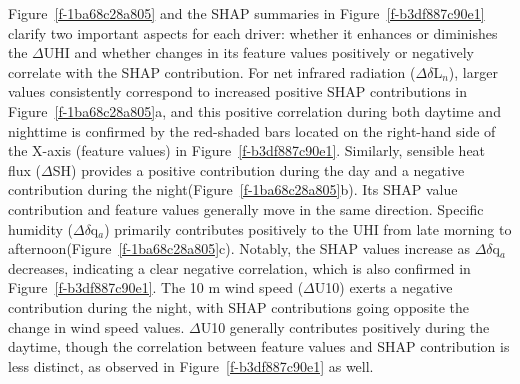 \documentclass[]{nature}
\makeatletter
\renewenvironment{figure}
               {\@float{figure}}
               {\end@float}
\renewenvironment{figure*}
               {\@dblfloat{figure}}
               {\end@dblfloat}
\def\fixFloatSize#1{}%
\def\fixFloatSize#1{}
\makeatother
\begin{document}
Figure~\ref{f-1ba68c28a805} and the SHAP summaries in Figure~\ref{f-b3df887c90e1}  clarify two important aspects for each driver: whether it enhances or diminishes the \ensuremath{\Delta }UHI and whether changes in its feature values positively or negatively correlate with the SHAP contribution. For net infrared radiation (\ensuremath{\Delta }\ensuremath{\delta }L\ensuremath{_{n}}), larger values consistently correspond to increased positive SHAP contributions in Figure~\ref{f-1ba68c28a805}a, and this positive correlation during both daytime and nighttime is confirmed by the red-shaded bars located on the right-hand side of the X-axis (feature values) in Figure~\ref{f-b3df887c90e1}. Similarly, sensible heat flux (\ensuremath{\Delta }SH) provides a positive contribution during the day and a negative contribution during the night(Figure~\ref{f-1ba68c28a805}b). Its SHAP value contribution and feature values generally move in the same direction. Specific humidity (\ensuremath{\Delta }\ensuremath{\delta }q\ensuremath{_{a}}) primarily contributes positively to the UHI from late morning to afternoon(Figure~\ref{f-1ba68c28a805}c). Notably, the SHAP values increase as \ensuremath{\Delta }\ensuremath{\delta }q\ensuremath{_{a}} decreases, indicating a clear negative correlation, which is also confirmed in Figure~\ref{f-b3df887c90e1}. The 10 m wind speed (\ensuremath{\Delta }U10) exerts a negative contribution during the night, with SHAP contributions going opposite the change in wind speed values. \ensuremath{\Delta }U10 generally contributes positively during the daytime, though the correlation between feature values and SHAP contribution is less distinct, as observed in Figure~\ref{f-b3df887c90e1}  as well. 


\bgroup
\fixFloatSize{images/0be8d0fa-326f-4c43-b7ce-8546c01e3ee5-uglobal_composite_2x3_fira_fsh_q2m_u10_soilwater_10cm_fgr.png}
\begin{figure*}[!htbp]
\centering \makeatletter{}
\makeatother 
\caption{{\textbf{Global hourly key feature SHAP contributions to \ensuremath{\Delta }UHI and feature values. }Hourly SHAP contributions (bars, \ensuremath{^\circ}C, left y-axis) and mean feature values (lines, right y-axis) for the global climate zone. Panels show: (a) net infrared radiation (\ensuremath{\Delta }\ensuremath{\delta }L\ensuremath{_{n}} in W/m\ensuremath{^2}), (b) sensible heat (\ensuremath{\Delta }SH in W/m\ensuremath{^2}), (c) 2-m specific humidity (\ensuremath{\Delta }\ensuremath{\delta }q\ensuremath{_{a}} in kg/kg ), (d) 10m wind speed (\ensuremath{\Delta }U10 in m/s), (e) 10 cm soil liquid water (\ensuremath{\Delta }\ensuremath{\Theta}10cm), and (f) ground heat flux (\ensuremath{\Delta }\ensuremath{\delta }G in W/m\ensuremath{^2}). Feature colors match Figure~\ref{f-85092bb5ad6f}.}}
\label{f-1ba68c28a805}
\end{figure*}
\egroup
\end{document}
